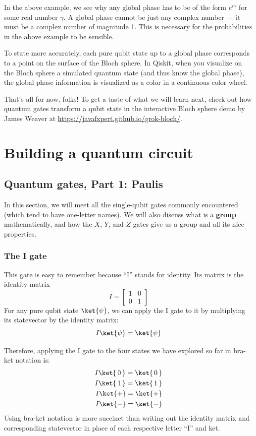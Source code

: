 \documentclass{article}
\theoremstyle{definition}
\newcommand{\kz}[1]{\ket{\,#1\,}}
\newcommand{\kx}[1]{\ket{#1}}
\begin{document}
In the above example, we see why any global phase has to be of the form $e^{i \gamma}$ for some real number $\gamma$.  A global phase cannot be just any complex number --- it must be a complex number of magnitude 1.  This is necessary for the probabilities in the above example to be sensible.

To state more accurately, each pure qubit state up to a global phase corresponds to a point on the surface of the Bloch sphere.  In Qiskit, when you visualize on the Bloch sphere a simulated quantum state (and thus know the global phase), the global phase information is visualized as a color in a continuous color wheel.

That's all for now, folks!
To get a taste of what we will learn next, check out how quantum gates transform a qubit state in the interactive Bloch sphere demo by James Weaver at \url{https://javafxpert.github.io/grok-bloch/}.

\section{Building a quantum circuit}

\subsection{Quantum gates, Part 1: Paulis}
In this section, we will meet all the single-qubit gates commonly encountered (which tend to have one-letter names).
We will also discuss what is a \textbf{group} mathematically, and how the $X$, $Y$, and $Z$ gates give us a group and all its nice properties.

\subsubsection{The I gate}
This gate is easy to remember because ``I'' stands for identity.
Its matrix is the identity matrix
\begin{equation}
	I = \begin{bmatrix}
		1 & 0\\
		0 & 1
	\end{bmatrix}
\end{equation}
For any pure qubit state $\ket{\psi}$, we can apply the I gate to it by multiplying its statevector by the identity matrix:
\begin{equation}
	I \ket{\psi} = \ket{\psi}
\end{equation}

Therefore, applying the I gate to the four states we have explored so far in bra-ket notation is:
\begin{align}
	I \kz0 = \kz0\\
	I \kz1 = \kz1\\
	I \kx+ = \kx+\\
	I \kx- = \kx-
\end{align}
Using bra-ket notation is more succinct than writing out the identity matrix and corresponding statevector in place of each respective letter ``I'' and ket.
\end{document}
